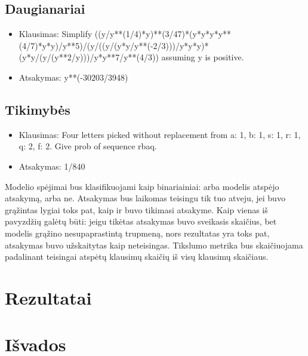 \documentclass[conference]{IEEEtran}
\begin{document}
\subsection{Daugianariai}
\begin{itemize}
    \item Klausimas: Simplify ((y/y**(1/4)*y)**(3/47)*(y*y*y*y**(4/7)*y*y)/y**5)/(y/((y/(y*y/y**(-2/3)))/y*y*y)*(y*y/(y/(y**2/y)))/y*y**7/y**(4/3)) assuming y is positive.
    \item Atsakymas: y**(-30203/3948)
\end{itemize}
\subsection{Tikimybės}
\begin{itemize}
    \item Klausimas: Four letters picked without replacement from {a: 1, b: 1, s: 1, r: 1, q: 2, f: 2}. Give prob of sequence rbaq.
    \item Atsakymas: 1/840
\end{itemize}

Modelio spėjimai bus klasifikuojami kaip binariainiai: arba modelis atspėjo atsakymą, arba ne.
Atsakymas bus laikomas teisingu tik tuo atveju, jei buvo grąžintas lygiai toks pat, kaip ir buvo tikimasi atsakyme.
Kaip vienas iš pavyzdžių galėtų būti: jeigu tikėtas atsakymas buvo sveikasis skaičius, bet modelis grąžino
nesupaprastintą trupmeną, nors rezultatas yra toks pat, atsakymas buvo užskaitytas kaip neteisingas.
Tikslumo metrika bus skaičiuojama padalinant teisingai atspėtų klausimų skaičių iš visų klausimų skaičiaus.

\section{Rezultatai}

\section{Išvados}





\end{document}
